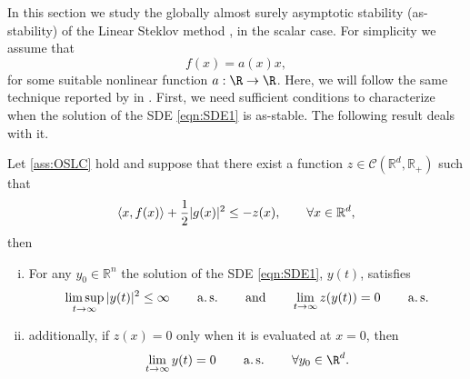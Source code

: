 	In this section we study the globally almost surely asymptotic stability (as-stability) of the 
Linear Steklov  method , in the scalar case.
For simplicity we assume that
$$
	f(x) = a(x)x,
$$
for some suitable nonlinear function $a:\R \to \R$.
Here, we will follow the same technique reported by \citeauthor*{Mao2013} in \cite{Mao2013}.
First, we need sufficient conditions to characterize when the solution of the SDE \eqref{eqn:SDE1} is as-stable. 
The following result deals with it.

\begin{thm}
	Let \cref{ass:OSLC} hold and suppose that there exist a function $z\in \mathcal{C}(\mathbb{R}^d,\mathbb{R}_+)$
	such that
	\begin{equation*}
		\left\langle x, f(x)\right\rangle +
		\frac{1}{2}|g(x)|^2\leq -z(x), \qquad \forall x\in \mathbb{R}^d,
	\end{equation*}
	then 
	\begin{enumerate}[(i)]
		\item
			For any $y_0\in \mathbb{R}^n$ the solution of the SDE \eqref{eqn:SDE1}, $y(t)$, satisfies
			\begin{equation*}
				\limsup_{t\to \infty}
					|y(t)|^2 \leq \infty \qquad \operatorname*{a.s.} \qquad \text{and} \qquad 
					\lim_{t\to \infty} z(y(t))= 0 \qquad \operatorname*{a.s.}
			\end{equation*}
		\item
			additionally, if $z(x)=0$ only when it is evaluated at $x=0$, then
			\begin{equation*}
				\lim_{t\to \infty} y(t)=0 \qquad \as \qquad \forall y_0\in \R^d.
			\end{equation*}
	\end{enumerate}
\end{thm}

